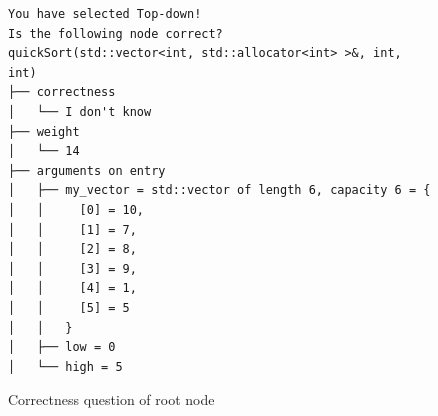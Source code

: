 \begin{figure}[h]
    \centering
    \caption{Correctness question of root node}
    \label{fig:correctnessQuestion}
    \begin{verbatim}
You have selected Top-down!
Is the following node correct?
quickSort(std::vector<int, std::allocator<int> >&, int, int)         
├── correctness                                                                                                                                       
│   └── I don't know                                                                                                                                  
├── weight                                                                                                                                            
│   └── 14                                                                                                                                            
├── arguments on entry                                                                                                                                
│   ├── my_vector = std::vector of length 6, capacity 6 = {                                                                                           
│   │     [0] = 10,                                                                                                                                   
│   │     [1] = 7,                                                                                                                                    
│   │     [2] = 8,                                                                                                                                    
│   │     [3] = 9,                                                                                                                                    
│   │     [4] = 1,                                                                                                                                    
│   │     [5] = 5                                                                                                                                     
│   │   }                                                                                                                                             
│   ├── low = 0                                                                                                                                       
│   └── high = 5                                                                                                                                      

\end{verbatim}
\end{figure}
